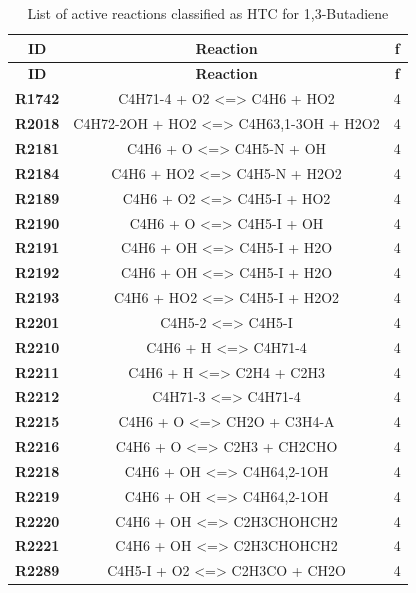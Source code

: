 \begin{longtable}{ccc}
\caption{List of active reactions classified as HTC for 1,3-Butadiene}\\
\hline
\textbf{ID} & \textbf{Reaction} & \textbf{f} \\
\hline
\endfirsthead
\hline
\textbf{ID} & \textbf{Reaction} & \textbf{f} \\
\hline
\endhead
\textbf{R1742} & C4H71-4 + O2 \textless{}=\textgreater{} C4H6 + HO2 & 4 \\
\textbf{R2018} & C4H72-2OH + HO2 \textless{}=\textgreater{} C4H63,1-3OH + H2O2 & 4 \\
\textbf{R2181} & C4H6 + O \textless{}=\textgreater{} C4H5-N + OH & 4 \\
\textbf{R2184} & C4H6 + HO2 \textless{}=\textgreater{} C4H5-N + H2O2 & 4 \\
\textbf{R2189} & C4H6 + O2 \textless{}=\textgreater{} C4H5-I + HO2 & 4 \\
\textbf{R2190} & C4H6 + O \textless{}=\textgreater{} C4H5-I + OH & 4 \\
\textbf{R2191} & C4H6 + OH \textless{}=\textgreater{} C4H5-I + H2O & 4 \\
\textbf{R2192} & C4H6 + OH \textless{}=\textgreater{} C4H5-I + H2O & 4 \\
\textbf{R2193} & C4H6 + HO2 \textless{}=\textgreater{} C4H5-I + H2O2 & 4 \\
\textbf{R2201} & C4H5-2 \textless{}=\textgreater{} C4H5-I & 4 \\
\textbf{R2210} & C4H6 + H \textless{}=\textgreater{} C4H71-4 & 4 \\
\textbf{R2211} & C4H6 + H \textless{}=\textgreater{} C2H4 + C2H3 & 4 \\
\textbf{R2212} & C4H71-3 \textless{}=\textgreater{} C4H71-4 & 4 \\
\textbf{R2215} & C4H6 + O \textless{}=\textgreater{} CH2O + C3H4-A & 4 \\
\textbf{R2216} & C4H6 + O \textless{}=\textgreater{} C2H3 + CH2CHO & 4 \\
\textbf{R2218} & C4H6 + OH \textless{}=\textgreater{} C4H64,2-1OH & 4 \\
\textbf{R2219} & C4H6 + OH \textless{}=\textgreater{} C4H64,2-1OH & 4 \\
\textbf{R2220} & C4H6 + OH \textless{}=\textgreater{} C2H3CHOHCH2 & 4 \\
\textbf{R2221} & C4H6 + OH \textless{}=\textgreater{} C2H3CHOHCH2 & 4 \\
\textbf{R2289} & C4H5-I + O2 \textless{}=\textgreater{} C2H3CO + CH2O & 4 \\
\hline
\end{longtable}